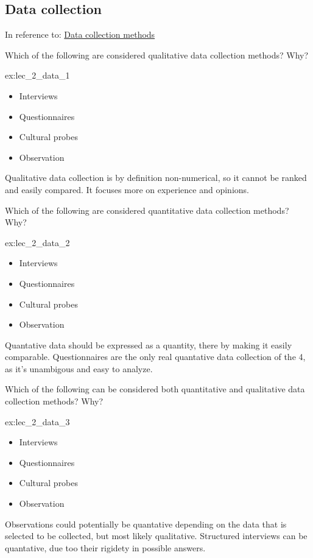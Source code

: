 \subsection{Data collection}
In reference to: \href{chp:data_collection}{Data collection methods}
\begin{exercise}{\parbox{\linewidth*3/4}{Which of the following are considered qualitative data collection methods? Why?}}{ex:lec_2_data_1}
    \begin{itemize}
        \item Interviews \checkmark
        \item Questionnaires 
        \item Cultural probes \checkmark
        \item Observation \checkmark
    \end{itemize}
    Qualitative data collection is by definition non-numerical, so it cannot be ranked and easily compared. It focuses more on experience and opinions. 
\end{exercise}

\begin{exercise}{\parbox{\linewidth*3/4}{Which of the following are considered quantitative data collection methods? Why?}}{ex:lec_2_data_2}
    \begin{itemize}
        \item Interviews
        \item Questionnaires \checkmark
        \item Cultural probes 
        \item Observation 
    \end{itemize}
    Quantative data should be expressed as a quantity, there by making it easily comparable. Questionnaires are the only real quantative data collection of the 4, as it's unambigous and easy to analyze. 
\end{exercise}

\begin{exercise}{\parbox{\linewidth*3/4}{Which of the following can be considered both quantitative and qualitative data collection methods? Why?}}{ex:lec_2_data_3}
    \begin{itemize}
        \item Interviews \checkmark
        \item Questionnaires 
        \item Cultural probes 
        \item Observation \checkmark
    \end{itemize}
    Observations could potentially be quantative depending on the data that is selected to be collected, but most likely qualitative. Structured interviews can be quantative, due too their rigidety in possible answers.
\end{exercise}

